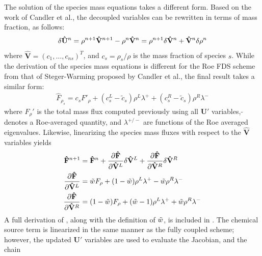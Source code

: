 The solution of the species mass equations takes a different form.  Based on the
work of Candler et al.\cite{candler}, the decoupled variables can be rewritten
in terms of mass fraction, as follows:
\begin{equation} 
  \delta \mathbf{\hat{U}}^n 
  = \rho^{n+1} \mathbf{\hat{V}}^{n+1} - \rho^n\mathbf{\hat{V}}^n 
  = \rho^{n+1} \delta \mathbf{\hat{V}}^n + \mathbf{\hat{V}}^n \delta \rho^n
  \label{du-to-dv-mass-frac}
\end{equation}
where $\mathbf{\hat{V}}=(c_1,\hdots,c_{ns})^T$, and $c_s=\rho_s/\rho$ is the
mass fraction of species $s$.  While the derivation of the species mass
equations is different for the Roe FDS scheme from that of Steger-Warming
proposed by Candler et al.\cite{candler}, the final result takes a similar form: 
\begin{gather} 
  \hat{F}_{\rho_s} 
  = c_s F'_\rho+(c_s^L-\tilde{c}_s)\rho^L\lambda^+
  + (c_s^R-\tilde{c}_s)\rho^R\lambda^-
  \label{dc-flux}
\end{gather}
where $F_\rho'$ is the total mass flux computed previously using all
$\mathbf{U}'$ variables, $\tilde{}$ denotes a Roe-averaged quantity, and
$\lambda^{+/-}$ are functions of the Roe averaged eigenvalues.  Likewise,
linearizing the species mass fluxes with respect to the $\mathbf{\hat{V}}$
variables yields
\begin{align} 
  \mathbf{\hat{F}}^{n+1} &=
  \mathbf{\hat{F}}^n 
  + \frac{\partial \mathbf{\hat{F}}}{\partial \mathbf{\hat{V}}^L} \delta \mathbf{\hat{V}}^L 
  + \frac{\partial \mathbf{\hat{F}}}{\partial \mathbf{\hat{V}}^R} \delta \mathbf{\hat{V}}^R
  \label{flux-dc-taylor} \\
  \frac{\partial \mathbf{\hat{F}}}{\partial \mathbf{\hat{V}}^L} &= 
  \tilde{w} F_\rho+(1-\tilde{w})\rho^L\lambda^+ - \tilde{w} \rho^R\lambda^- 
  \label{dfdvl} \\
  \frac{\partial \mathbf{\hat{F}}}{\partial \mathbf{\hat{V}}^R} &= 
  ( 1-\tilde{w} )F_\rho+(\tilde{w} -1)\rho^L\lambda^+ + \tilde{w} \rho^R\lambda^- 
  \label{dfdvr}
\end{align}
A full derivation of , along with the definition of
$\tilde{w}$, is included in . The chemical source
term is linearized in the same manner as the fully coupled scheme; however, the
updated $\mathbf{U}'$ variables are used to evaluate the Jacobian, and the chain
